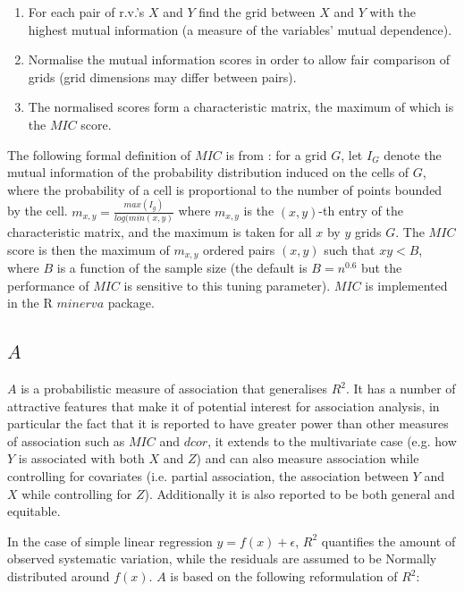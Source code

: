 \documentclass[a4paper, 12pt]{report}
\begin{document}
\begin{enumerate}
\item For each pair of r.v.'s $X$ and $Y$ find the grid between $X$ and $Y$ with the highest mutual information (a measure of the variables' mutual dependence).%
\item Normalise the mutual information scores in order to allow fair comparison of grids (grid dimensions may differ between pairs).
\item The normalised scores form a characteristic matrix, the maximum of which is the $MIC$ score.
\end{enumerate}

The following formal definition of $MIC$ is from \citet{mic2011}: for a grid $G$, let $I_G$ denote the mutual information of the probability distribution induced on the cells of $G$, where the probability of a cell is proportional to the number of points bounded by the cell. $m_{x,y} = \frac{max(I_g)}{log(min(x,y)}$ where $m_{x,y}$ is the $(x,y)$-th entry of the characteristic matrix, and the maximum is taken for all $x$ by $y$ grids $G$. The $MIC$ score is then the maximum of $m_{x,y}$ ordered pairs $(x,y)$ such that $xy < B$, where $B$ is a function of the sample size (the default is $B=n^{0.6}$ but the performance of $MIC$ is sensitive to this tuning parameter).  $MIC$ is implemented in the R $minerva$ \cite{minerva} package.

\subsection*{$A$}
$A$ is a probabilistic measure of association that generalises $R^2$. It has a number of attractive features that make it of potential interest for association analysis, in particular the fact that it is reported\cite{Murrel:2013:Online} to have greater power than other measures of association such as $MIC$ and $dcor$, it extends to the multivariate case (e.g. how $Y$ is associated with both $X$ and $Z$) and can also measure association while controlling for covariates (i.e. partial association, the association between $Y$ and $X$ while controlling for $Z$). Additionally it is also reported to be both general and equitable\cite{Murrel:2013:Online}.

In the case of simple linear regression $y = f(x) + \epsilon$, $R^2$ quantifies the amount of observed systematic variation, while the residuals are assumed to be Normally distributed around $f(x)$. $A$ is based on the following reformulation of $R^2$:
\end{document}
